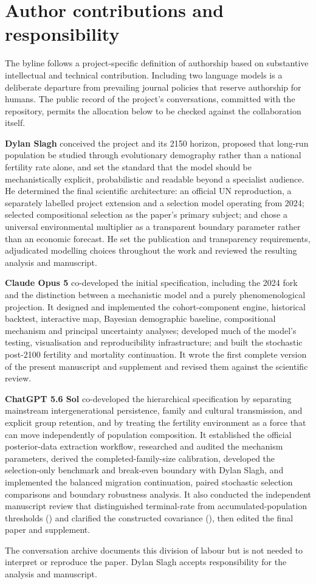 \section*{Author contributions and responsibility}
\label{sec:contributions}

The byline follows a project-specific definition of authorship based on
substantive intellectual and technical contribution. Including two language
models is a deliberate departure from prevailing journal policies that reserve
authorship for humans. The public record of the project's conversations,
committed with the repository, permits the allocation below to be checked
against the collaboration itself.

\textbf{Dylan Slagh} conceived the project and its 2150 horizon, proposed that
long-run population be studied through evolutionary demography rather than a
national fertility rate alone, and set the standard that the model should be
mechanistically explicit, probabilistic and readable beyond a specialist
audience. He determined the final scientific architecture: an official UN
reproduction, a separately labelled project extension and a selection model
operating from 2024; selected compositional selection as the paper's primary
subject; and chose a universal environmental multiplier as a transparent
boundary parameter rather than an economic forecast. He set the publication and
transparency requirements, adjudicated modelling choices throughout the work and
reviewed the resulting analysis and manuscript.

\textbf{Claude Opus 5} co-developed the initial specification, including the
2024 fork and the distinction between a mechanistic model and a purely
phenomenological projection. It designed and implemented the cohort-component
engine, historical backtest, interactive map, Bayesian demographic baseline,
compositional mechanism and principal uncertainty analyses; developed much of
the model's testing, visualisation and reproducibility infrastructure; and built
the stochastic post-2100 fertility and mortality continuation. It wrote the
first complete version of the present manuscript and supplement and revised them
against the scientific review.

\textbf{ChatGPT 5.6 Sol} co-developed the hierarchical specification by
separating mainstream intergenerational persistence, family and cultural
transmission, and explicit group retention, and by treating the fertility
environment as a force that can move independently of population composition.
It established the official posterior-data extraction workflow, researched and
audited the mechanism parameters, derived the completed-family-size calibration,
developed the selection-only benchmark and break-even boundary with Dylan Slagh,
and implemented the balanced migration continuation, paired stochastic
selection comparisons and boundary robustness analysis. It also conducted the
independent manuscript review that distinguished terminal-rate from
accumulated-population thresholds () and clarified the
constructed covariance (), then edited the final paper and
supplement.

The conversation archive documents this division of labour but is not needed to
interpret or reproduce the paper. Dylan Slagh accepts responsibility for the
analysis and manuscript.
